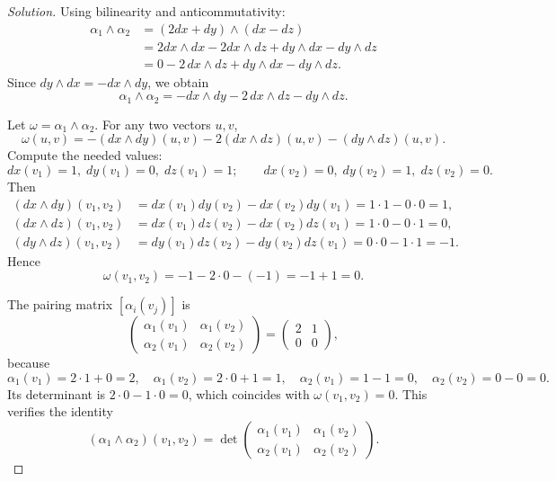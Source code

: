 \documentclass[12pt, a4paper]{article}
\theoremstyle{definition}
\newenvironment{solution}
  {\renewcommand\qedsymbol{$\blacksquare$}\begin{proof}[Solution]}
  {\end{proof}}
\begin{document}
\begin{solution}
    \item[(a)] Using bilinearity and anticommutativity:
    \[
    \begin{aligned}
    \alpha_1 \wedge \alpha_2 &= (2dx + dy) \wedge (dx - dz) \\
    &= 2dx \wedge dx - 2dx \wedge dz + dy \wedge dx - dy \wedge dz \\
    &= 0 - 2\,dx\wedge dz + dy\wedge dx - dy\wedge dz.
    \end{aligned}
    \]
    Since \(dy\wedge dx = -dx\wedge dy\), we obtain
    \[
    \alpha_1 \wedge \alpha_2 = -dx\wedge dy - 2\,dx\wedge dz - dy\wedge dz.
    \]
    \item[(b)] Let \(\omega = \alpha_1 \wedge \alpha_2\). For any two vectors \(u,v\),
    \[
    \omega(u,v) = - (dx\wedge dy)(u,v) - 2(dx\wedge dz)(u,v) - (dy\wedge dz)(u,v).
    \]
    Compute the needed values:
    \[
    dx(v_1)=1,\; dy(v_1)=0,\; dz(v_1)=1;\qquad dx(v_2)=0,\; dy(v_2)=1,\; dz(v_2)=0.
    \]
    Then
    \[
    \begin{aligned}
    (dx\wedge dy)(v_1,v_2) &= dx(v_1)dy(v_2) - dx(v_2)dy(v_1) = 1\cdot1 - 0\cdot0 = 1,\\
    (dx\wedge dz)(v_1,v_2) &= dx(v_1)dz(v_2) - dx(v_2)dz(v_1) = 1\cdot0 - 0\cdot1 = 0,\\
    (dy\wedge dz)(v_1,v_2) &= dy(v_1)dz(v_2) - dy(v_2)dz(v_1) = 0\cdot0 - 1\cdot1 = -1.
    \end{aligned}
    \]
    Hence
    \[
    \omega(v_1,v_2) = -1 - 2\cdot0 - (-1) = -1 + 1 = 0.
    \]
    \item[(c)] The pairing matrix \([\alpha_i(v_j)]\) is
    \[
    \begin{pmatrix}
    \alpha_1(v_1) & \alpha_1(v_2) \\
    \alpha_2(v_1) & \alpha_2(v_2)
    \end{pmatrix}
    = \begin{pmatrix}
    2 & 1 \\
    0 & 0
    \end{pmatrix},
    \]
    because
    \[
    \alpha_1(v_1)=2\cdot1+0=2,\quad \alpha_1(v_2)=2\cdot0+1=1,\quad \alpha_2(v_1)=1-1=0,\quad \alpha_2(v_2)=0-0=0.
    \]
    Its determinant is \(2\cdot0 - 1\cdot0 = 0\), which coincides with \(\omega(v_1,v_2)=0\). This verifies the identity
    \[
    (\alpha_1 \wedge \alpha_2)(v_1,v_2) = \det\begin{pmatrix}
    \alpha_1(v_1) & \alpha_1(v_2) \\
    \alpha_2(v_1) & \alpha_2(v_2)
    \end{pmatrix}.
    \]
\end{solution}
\end{document}
